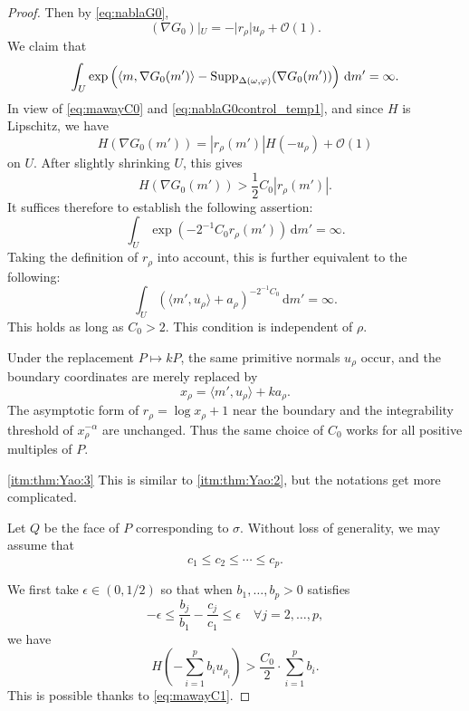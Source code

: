 \begin{proof}
    Then by \eqref{eq:nablaG0},
    \begin{equation}\label{eq:nablaG0control_temp1}
    \left( \nabla G_0 \right)|_U= -|r_{\rho}|u_{\rho}+\mathcal{O}(1).
    \end{equation}
    We claim that
    \[
    \int_U \exp\left(\langle m,\nabla G_0(m') \rangle-\operatorname{Supp}_{\Delta(\omega,\varphi)}(\nabla G_0(m'))\right)\,\mathrm{d}m'=\infty.
    \]
    In view of \eqref{eq:mawayC0} and \eqref{eq:nablaG0control_temp1}, and since $H$ is Lipschitz, we have
    \[
    H(\nabla G_0(m'))=|r_{\rho}(m')|H(-u_{\rho})+\mathcal{O}(1)
    \]
    on $U$. After slightly shrinking $U$, this gives
    \[
    H(\nabla G_0(m'))> \frac{1}{2}C_0 |r_{\rho}(m')|.
    \]
    It suffices therefore to establish the following assertion:
    \[
    \int_U \exp\left(- 2^{-1}C_0 r_{\rho}(m')\right)\,\mathrm{d}m'=\infty.
    \]
    Taking the definition of $r_{\rho}$ into account, this is further equivalent to the following:
    \[
    \int_U \left( \langle m',u_{\rho} \rangle +a_\rho \right)^{-2^{-1}C_0}\,\mathrm{d}m'=\infty.
    \]
    This holds as long as $C_0>2$. This condition is independent of $\rho$.

    Under the replacement $P\mapsto kP$, the same primitive normals $u_\rho$ occur, and the boundary coordinates are merely replaced by
    \[
        x_\rho=\langle m',u_\rho\rangle+ka_\rho.
    \]
    The asymptotic form of $r_\rho=\log x_\rho+1$ near the boundary and the integrability threshold of $x_\rho^{-\alpha}$ are unchanged. Thus the same choice of $C_0$ works for all positive multiples of $P$.

    \ref{itm:thm:Yao:3} This is similar to \ref{itm:thm:Yao:2}, but the notations get more complicated.

    Let $Q$ be the face of $P$ corresponding to $\sigma$. Without loss of generality, we may assume that
    \[
    c_1\leq c_2\leq \cdots\leq c_p.
    \]

    We first take $\epsilon\in (0,1/2)$ so that when $b_1,\ldots,b_p>0$ satisfies
    \[
    -\epsilon\leq \frac{b_{j}}{b_1}-\frac{c_{j}}{c_1}\leq \epsilon\quad\forall j=2,\ldots,p,
    \]
    we have
    \[
    H\left(-\sum_{i=1}^p b_i u_{\rho_i}\right)> \frac{C_0}{2}\cdot \sum_{i=1}^p b_i.
    \]
    This is possible thanks to \eqref{eq:mawayC1}.


\end{proof}
